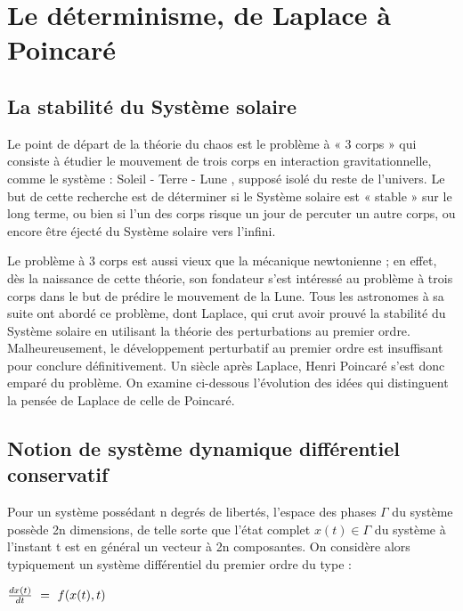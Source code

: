 \documentclass[10pt,a4paper]{article}
\begin{document}
\section{Le déterminisme, de Laplace à Poincaré}

\subsection{La stabilité du Système solaire}

Le point de départ de la théorie du chaos est le problème à « 3 corps » qui consiste à étudier le mouvement de trois corps en interaction gravitationnelle, comme le système : { Soleil - Terre - Lune }, supposé isolé du reste de l'univers. Le but de cette recherche est de déterminer si le Système solaire est « stable » sur le long terme, ou bien si l'un des corps risque un jour de percuter un autre corps, ou encore être éjecté du Système solaire vers l'infini.\vspace{0.40cm}

Le problème à 3 corps est aussi vieux que la mécanique newtonienne ; en effet, dès la naissance de cette théorie, son fondateur s'est intéressé au problème à trois corps dans le but de prédire le mouvement de la Lune. Tous les astronomes à sa suite ont abordé ce problème, dont Laplace, qui crut avoir prouvé la stabilité du Système solaire en utilisant la théorie des perturbations au premier ordre. Malheureusement, le développement perturbatif au premier ordre est insuffisant pour conclure définitivement. Un siècle après Laplace, Henri Poincaré s'est donc emparé du problème. On examine ci-dessous l'évolution des idées qui distinguent la pensée de Laplace de celle de Poincaré.

\subsection{Notion de système dynamique différentiel conservatif}
Pour un système possédant n degrés de libertés, l'espace des phases ${\displaystyle \Gamma }$ du système possède 2n dimensions, de telle sorte que l'état complet ${\displaystyle x(t)\in \Gamma }$ du système à l'instant t est en général un vecteur à 2n composantes. On considère alors typiquement un système différentiel du premier ordre du type :\vspace{0.40cm}

\begin{math}
{\frac {dx(t)}{dt}}\ =\ f(x(t),t)\vspace{0.40cm}
\end{math}
\end{document}
